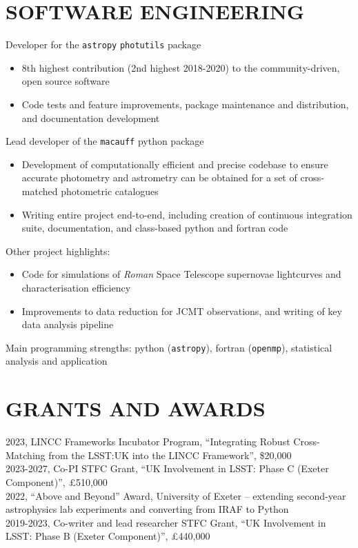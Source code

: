 \documentclass[letter, margin, 10pt]{res} %
\begin{document}
\begin{resume}
\section{SOFTWARE ENGINEERING}

Developer for the \texttt{astropy} \texttt{photutils} package
\begin{itemize}[noitemsep,topsep=0pt,parsep=0pt,partopsep=0pt]
\item 8th highest contribution (2nd highest 2018-2020) to the community-driven, open source software
\item Code tests and feature improvements, package maintenance and distribution, and documentation development
\end{itemize}
\vspace{-10pt}
Lead developer of the \texttt{macauff} python package
\begin{itemize}[noitemsep,topsep=0pt,parsep=0pt,partopsep=0pt]
\item Development of computationally efficient and precise codebase to ensure accurate photometry and astrometry can be obtained for a set of cross-matched photometric catalogues
\item Writing entire project end-to-end, including creation of continuous integration suite, documentation, and class-based python and fortran code
\end{itemize}
\vspace{-10pt}
Other project highlights:
\begin{itemize}[noitemsep,topsep=0pt,parsep=0pt,partopsep=0pt]
\item Code for simulations of \textit{Roman} Space Telescope supernovae lightcurves and characterisation efficiency
\item Improvements to data reduction for JCMT observations, and writing of key data analysis pipeline
\end{itemize}
\vspace{-10pt}
Main programming strengths: python (\texttt{astropy}), fortran (\texttt{openmp}), statistical analysis and application

\parskip 5pt
\vspace{-6pt}
\section{GRANTS AND AWARDS}
2023, LINCC Frameworks Incubator Program, ``Integrating Robust Cross-Matching from the LSST:UK into the LINCC Framework'', \$20,000\\
2023-2027, Co-PI STFC Grant, ``UK Involvement in LSST: Phase C (Exeter Component)'', £510,000\\
2022, ``Above and Beyond'' Award, University of Exeter -- extending second-year astrophysics lab experiments and converting from IRAF to Python\\
2019-2023, Co-writer and lead researcher STFC Grant, ``UK Involvement in LSST: Phase B (Exeter Component)'', £440,000


\end{resume}
\end{document}
